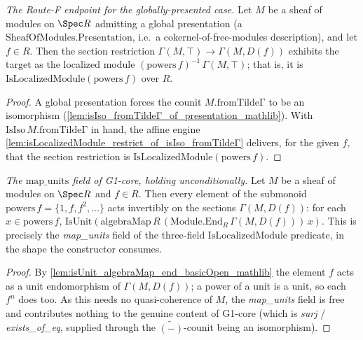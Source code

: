 \begin{lemma}
  \label{lem:isLocalizedModule_basicOpen_of_presentation}
  \textit{The Route-F endpoint for the globally-presented case.}
  Let \(M\) be a sheaf of modules on \(\Spec R\) admitting a global presentation (a
  \(\mathrm{SheafOfModules.Presentation}\), i.e.\ a cokernel-of-free-modules description), and let
  \(f \in R\). Then the section restriction \(\Gamma(M, \top) \to \Gamma(M, D(f))\) exhibits the
  target as the localized module \((\mathrm{powers}\,f)^{-1}\,\Gamma(M, \top)\); that is, it is
  \(\mathrm{IsLocalizedModule}(\mathrm{powers}\,f)\) over \(R\).
\end{lemma}
\begin{proof}
  A global presentation forces the counit \(M.\mathrm{fromTildeΓ}\) to be an isomorphism
  (\cref{lem:isIso_fromTildeΓ_of_presentation_mathlib}). With \(\mathrm{IsIso}\,M.\mathrm{fromTildeΓ}\)
  in hand, the affine engine \cref{lem:isLocalizedModule_restrict_of_isIso_fromTildeΓ} delivers, for
  the given \(f\), that the section restriction is \(\mathrm{IsLocalizedModule}(\mathrm{powers}\,f)\).
\end{proof}

\begin{lemma}
  \label{lem:map_units_restrict_basicOpen}
  \textit{The \(\mathrm{map\_units}\) field of G1-core, holding unconditionally.}
  Let \(M\) be a sheaf of modules on \(\Spec R\) and \(f \in R\). Then every element of the submonoid
  \(\mathrm{powers}\,f = \{1, f, f^2, \dots\}\) acts invertibly on the sections \(\Gamma(M, D(f))\):
  for each \(x \in \mathrm{powers}\,f\),
  \(\mathrm{IsUnit}(\mathrm{algebraMap}\,R\,(\mathrm{Module.End}_R\,\Gamma(M, D(f)))\,x)\). This is
  precisely the \emph{map\_units} field of the three-field \(\mathrm{IsLocalizedModule}\) predicate,
  in the shape the constructor consumes.
\end{lemma}
\begin{proof}
  By \cref{lem:isUnit_algebraMap_end_basicOpen_mathlib} the element \(f\) acts as a unit
  endomorphism of \(\Gamma(M, D(f))\); a power of a unit is a unit, so each \(f^n\) does too. As this
  needs no quasi-coherence of \(M\), the \emph{map\_units} field is free and contributes nothing to
  the genuine content of G1-core (which is \emph{surj} / \emph{exists\_of\_eq}, supplied through the
  \(\widetilde{(-)}\)-counit being an isomorphism).
\end{proof}

